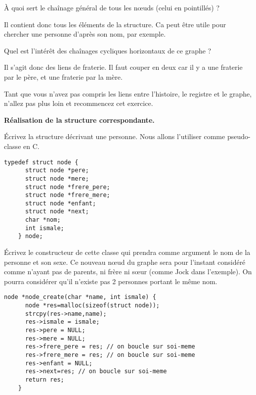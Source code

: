 \documentclass[10pt]{article}\usepackage[nu]{esial}
\begin{document}
\Question À quoi sert le chaînage général de tous les nœuds (celui en
pointillés) ?

\begin{Reponse}
  Il contient donc tous les éléments de la structure. Ca peut être utile pour
  chercher une personne d'après son nom, par exemple.
\end{Reponse}

\Question Quel est l'intérêt des chaînages cycliques horizontaux de ce graphe ?

\begin{Reponse}
  Il s'agit donc des liens de fraterie. Il faut couper en deux car il y a une
  fraterie par le père, et une fraterie par la mère.
\end{Reponse}

Tant que vous n'avez pas compris les liens entre l'histoire, le registre et le
graphe, n'allez pas plus loin et recommencez cet exercice.


\Exercice\textbf{Réalisation de la structure correspondante.}

\Question Écrivez la structure décrivant une personne. Nous allons l'utiliser
comme pseudo-classe en C.
\begin{Reponse}
  \begin{Verbatim}[gobble=4]
    typedef struct node {
      struct node *pere;
      struct node *mere;
      struct node *frere_pere;
      struct node *frere_mere;
      struct node *enfant;
      struct node *next;
      char *nom;
      int ismale;
    } node;
  \end{Verbatim}
\end{Reponse}

\Question Écrivez le constructeur de cette classe qui prendra comme argument le
nom de la personne et son sexe. Ce nouveau nœud du graphe sera pour l'instant
considéré comme n'ayant pas de parents, ni frère ni sœur (comme Jock dans
l'exemple). On pourra considérer qu'il n'existe pas 2 personnes portant le même
nom.

\begin{Reponse}
  \begin{Verbatim}[gobble=4]
    node *node_create(char *name, int ismale) {
      node *res=malloc(sizeof(struct node));
      strcpy(res->name,name);
      res->ismale = ismale;
      res->pere = NULL;
      res->mere = NULL;
      res->frere_pere = res; // on boucle sur soi-meme
      res->frere_mere = res; // on boucle sur soi-meme
      res->enfant = NULL;
      res->next=res; // on boucle sur soi-meme
      return res;
    }
  \end{Verbatim}
\end{Reponse}
\end{document}
